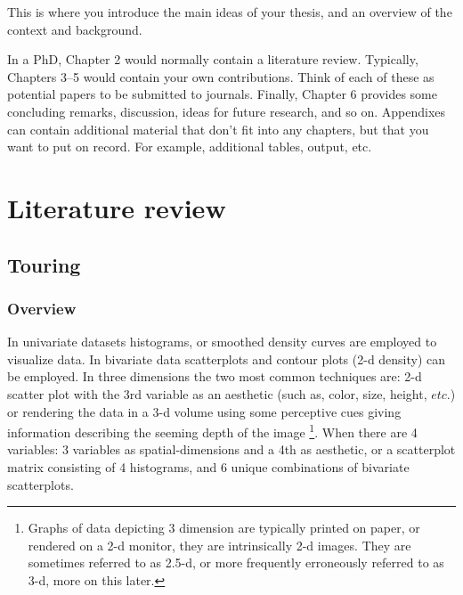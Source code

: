 \documentclass{monashthesis}
\begin{document}
This is where you introduce the main ideas of your thesis, and an
overview of the context and background.

In a PhD, Chapter 2 would normally contain a literature review.
Typically, Chapters 3--5 would contain your own contributions. Think of
each of these as potential papers to be submitted to journals. Finally,
Chapter 6 provides some concluding remarks, discussion, ideas for future
research, and so on. Appendixes can contain additional material that
don't fit into any chapters, but that you want to put on record. For
example, additional tables, output, etc.

\chapter{Literature review}\label{ch:lit_review}

\section{Touring}\label{sec:tour}

\subsection{Overview}\label{overview}

In univariate datasets histograms, or smoothed density curves are
employed to visualize data. In bivariate data scatterplots and contour
plots (2-d density) can be employed. In three dimensions the two most
common techniques are: 2-d scatter plot with the 3rd variable as an
aesthetic (such as, color, size, height, \(etc.\)) or rendering the data
in a 3-d volume using some perceptive cues giving information describing
the seeming depth of the image
\footnote{Graphs of data depicting 3 dimension are typically printed on paper, or rendered on a 2-d monitor, they are intrinsically 2-d images. They are sometimes referred to as 2.5-d, or more frequently erroneously referred to as 3-d, more on this later.}.
When there are 4 variables: 3 variables as spatial-dimensions and a 4th
as aesthetic, or a scatterplot matrix consisting of 4 histograms, and 6
unique combinations of bivariate scatterplots.
\end{document}
